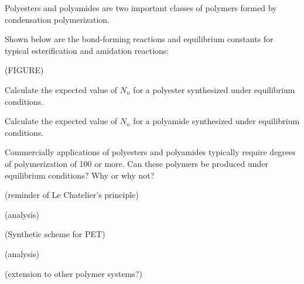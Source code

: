 \begin{activity}
\begin{ctqs}
\end{ctqs}
	

\begin{model}

Polyesters and polyamides are two important classes of polymers formed by condensation polymerization.

Shown below are the bond-forming reactions and equilibrium constants for typical esterification and amidation reactions:

(FIGURE)

\end{model}

\begin{ctqs}
		\question Calculate the expected value of $N_n$ for a polyester synthesized under equilibrium conditions.
		
		\question Calculate the expected value of $N_n$ for a polyamide synthesized under equilibrium conditions.
		
		\question Commercially applications of polyesters and polyamides typically require degrees of polymerization of 100 or more.  Can these polymers be produced under equilibrium conditions?  Why or why not?
			
\end{ctqs}
	
\begin{infobox}

(reminder of Le Chatelier's principle)

\end{infobox}
	
\begin{ctqs}
		\question (analysis)
		
\end{ctqs}

\begin{model}

(Synthetic scheme for PET)

\end{model}

\begin{ctqs}

		\question (analysis)
			
\end{ctqs}
	


\begin{exercises}

		\exercise (extension to other polymer systems?)
\end{exercises}
	
\end{activity}